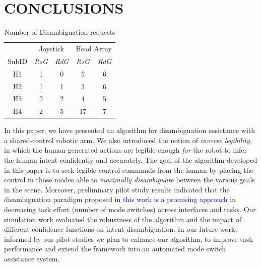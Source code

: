 \documentclass[conference]{IEEEtran}
\begin{document}
\section{CONCLUSIONS}\label{DC}
\begin{table}[t]
	\centering
	\begin{tabular}{ccccc}
		\toprule
		&\multicolumn{2}{c}{Joystick}
		&
		\multicolumn{2}{c}{Head Array} \\\cmidrule(r){2-3}\cmidrule(l){4-5}
		SubID &\textit{RsG}& \textit{RdG}    & \textit{RsG} &\textit{RdG}      \\
		\bottomrule
		H1 &1& 0   & 5 & 6  \\
		\bottomrule
		H2 &1& 1    & 3 & 6      \\
		\bottomrule
		H3 &2& 2    & 4 &5    \\
		\bottomrule
		H4 &2& 5    & 17 &7   \\
		\bottomrule
	\end{tabular}
	\vspace{.2cm}
	\caption{Number of Disambiguation requests}
	\label{ONDEMAND}
\end{table}
In this paper, we have presented an algorithm for disambiguation assistance with a shared-control robotic arm. We also introduced the notion of \textit{inverse legibility}, in which the human-generated actions are legible enough \textit{for} the robot to infer the human intent confidently and accurately. The goal of the algorithm developed in this paper is to seek legible control commands from the human by placing the control in those modes able to \textit{maximally disambiguate} between the various goals in the scene.  Moreover, preliminary pilot study results indicated that the disambiguation paradigm proposed \textcolor{blue}{in this work is a promising approach} in decreasing task effort (number of mode switches) across interfaces and tasks. Our simulation work evaluated the robustness of the algorithm and the impact of different confidence functions on intent disambiguation. In our future work, informed by our pilot studies we plan to enhance our algorithm, to improve task performance and extend the framework into an automated mode switch assistance system. 
\end{document}
